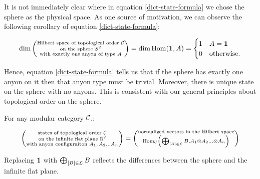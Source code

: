 \begin{rem} It is not immediately clear where in equation \ref{dict-state-formula} we chose the sphere as the physical space. As one source of motivation, we can observe the following corollary of equation \ref{dict-state-formula}:

\begin{equation*}
\dim\left(\substack{\text{Hilbert space of topological order ${\mathcal C}$} \\ \text{on the sphere $S^2$} \\ \text{with exactly one anyon of type $A$}}\right)
=
\dim \operatorname{Hom}({\mathbf 1}, A)
=
\begin{cases}
1 & A={\mathbf 1} \\ 
0 & \text{otherwise}.
\end{cases}
\end{equation*}

Hence, equation \ref{dict-state-formula} tells us that if the sphere has exactly one anyon on it then that anyon type must be trivial. Moreover, there is unique state on the sphere with no anyons. This is consistent with our general principles about topological order on the sphere.

\end{rem}

\begin{dict} For any modular category ${\mathcal C}$,:

\begin{equation}\label{dict-state-formula-2}
\left(\substack{\text{states of topological order ${\mathcal C}$} \\ \text{on the infinite flat plane ${\mathbb R}^2$} \\ \text{with anyon configuraiton $A_1,A_2...A _n$}}\right)
=
\left(
\substack{
\text{normalized vectors in the Hilbert space}\\
\operatorname{Hom}_{\mathcal C}\left(\bigoplus_{[B]\in {\mathcal L}}B, A_1\otimes A_2... \otimes A_n\right)
}
\right)
\end{equation}
\end{dict}

\begin{rem}
Replacing ${\mathbf 1}$ with $\bigoplus_{[B]\in {\mathcal L}} B$ reflects the differences between the sphere and the infinite flat plane.


\end{rem}

